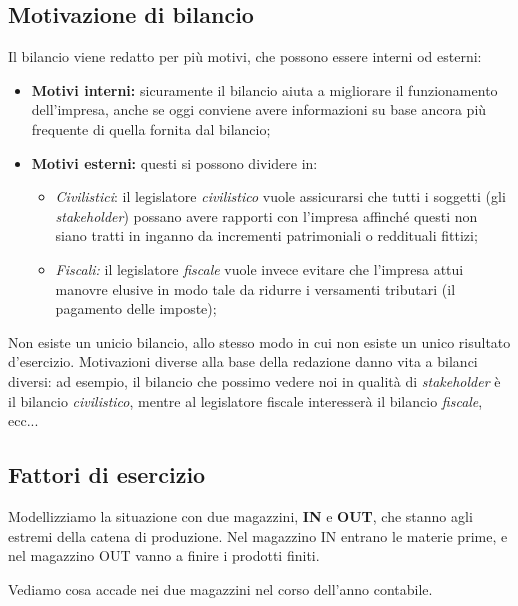 \documentclass[a4paper,11pt]{article}
\begin{document}
\subsection{Motivazione di bilancio}
Il bilancio viene redatto per più motivi, che possono essere interni od esterni:
\begin{itemize}
	\item \textbf{Motivi interni:} sicuramente il bilancio aiuta a migliorare il funzionamento dell'impresa, anche se oggi conviene avere informazioni su base ancora più frequente di quella fornita dal bilancio;

	\item \textbf{Motivi esterni:} questi si possono dividere in:
		\begin{itemize}
			\item \textit{Civilistici}: il legislatore \textit{civilistico} vuole assicurarsi che tutti i soggetti (gli \textit{stakeholder}) possano avere rapporti con l'impresa affinché questi non siano tratti in inganno da incrementi patrimoniali o reddituali fittizi;

			\item \textit{Fiscali:} il legislatore \textit{fiscale} vuole invece evitare che l'impresa attui manovre elusive in modo tale da ridurre i versamenti tributari (il pagamento delle imposte);
		\end{itemize}
\end{itemize}

Non esiste un unicio bilancio, allo stesso modo in cui non esiste un unico risultato d'esercizio.
Motivazioni diverse alla base della redazione danno vita a bilanci diversi: ad esempio, il bilancio che possimo vedere noi in qualità di \textit{stakeholder} è il bilancio \textit{civilistico}, mentre al legislatore fiscale interesserà il bilancio \textit{fiscale}, ecc...

\subsection{Fattori di esercizio}
 Modellizziamo la situazione con due magazzini, \textbf{IN} e \textbf{OUT}, che stanno agli estremi della catena di produzione.
Nel magazzino IN entrano le materie prime, e nel magazzino OUT vanno a finire i prodotti finiti.

Vediamo cosa accade nei due magazzini nel corso dell'anno contabile.
\end{document}

